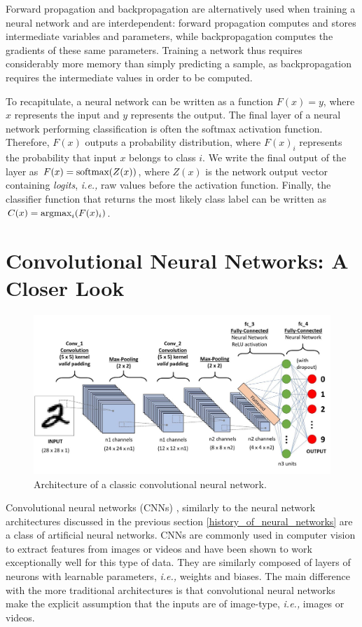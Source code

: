 Forward propagation and backpropagation are alternatively used when training a
neural network and are interdependent: forward propagation computes and stores
intermediate variables and parameters, while backpropagation computes the
gradients of these same parameters. Training a network thus requires
considerably more memory than simply predicting a sample, as backpropagation
requires the intermediate values in order to be computed.

To recapitulate, a neural network can be written as a function $F(x)=y$, where
$x$ represents the input and $y$ represents the output. The final layer of a
neural network performing classification is often the softmax activation
function. Therefore, $F(x)$ outputs a probability distribution, where $F(x)_{i}$
represents the probability that input $x$ belongs to class $i$. We write the
final output of the layer as $F(x)=\textup{softmax}(Z(x))$, where $Z(x)$ is the
network output vector containing \textit{logits}, \emph{i.e.,} raw values before
the activation function. Finally, the classifier function that returns the most
likely class label can be written as $C(x)=\textup{argmax}_{i}{(F(x)_{i})}$.

\section{Convolutional Neural Networks: A Closer Look}
\label{CNNs}

\begin{figure}[ht]
    \includegraphics[clip,width=1\columnwidth]{Figures/related/cnn.jpeg}
    \caption{ Architecture of a classic convolutional neural network. }
    \label{fig:cnn}
\end{figure}

Convolutional neural networks (CNNs) \cite{lecun_object_1999}, similarly to the
neural network architectures discussed in the previous section
\ref{history_of_neural_networks} are a class of artificial neural networks. CNNs are
commonly used in computer vision to extract features from images or videos and
have been shown to work exceptionally well for this type of data. They are
similarly composed of layers of neurons with learnable parameters, \emph{i.e.,}
weights and biases. The main difference with the more traditional architectures
is that convolutional neural networks make the explicit assumption that the
inputs are of image-type, \emph{i.e.,} images or videos.

